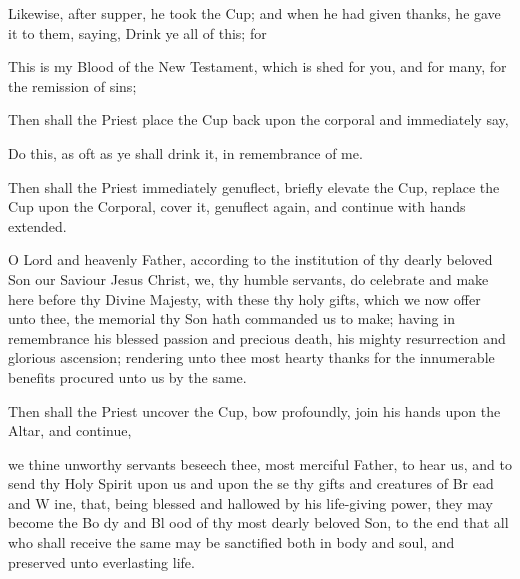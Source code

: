 Likewise, after supper, he took the Cup; and when he had given {} thanks, he gave it to them, saying, Drink ye all of this; for
\begin{center}
\large{This is my Blood of the New Testament, which is shed for you, and for many, for the remission of sins;}
\end{center}
\begin{rubric}
    Then shall the Priest place the Cup back upon the corporal and immediately say,
\end{rubric}\par\noindent
    \centerline{Do this, as oft as ye shall drink it, in remembrance of me.}
\begin{rubric}
    Then shall the Priest immediately genuflect, briefly elevate the Cup, replace the Cup upon the Corporal, cover it, genuflect again, and continue with hands extended.
\end{rubric}
 O Lord and heavenly Father, according to the institution of thy dearly beloved Son our Saviour Jesus Christ, we, thy humble servants, do celebrate and make here before thy Divine Majesty, with these thy holy {} gifts, which we now offer unto thee, the memorial thy Son hath commanded us to make; having in remembrance his blessed passion and precious death, his mighty resurrection and glorious ascension; rendering unto thee most hearty thanks for the innumerable benefits procured unto us by the same.
\begin{rubric}
	Then shall the Priest uncover the Cup, bow profoundly, join his hands upon the Altar, and continue,
\end{rubric}
 we thine unworthy servants beseech thee, most merciful Father, to hear us, and to send thy Holy Spirit upon us and upon the {} se thy gifts and creatures of Br {} ead and W {} ine, that, being blessed and hallowed by his life-giving power, they may become the Bo {} dy and Bl {} ood of thy most dearly beloved Son, to the end that all who shall receive the same may be sanctified both in body and soul, and preserved unto everlasting life.
